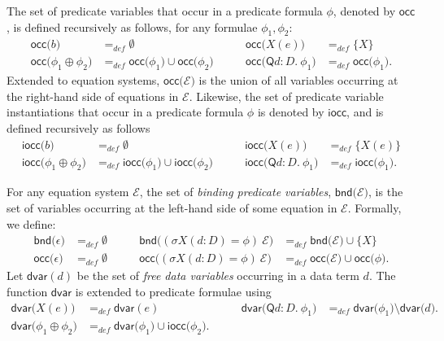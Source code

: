 \documentclass{article}
\begin{document}
The set of predicate variables that occur in a predicate formula $\phi $,
denoted by $\mathsf{occ}$, is defined recursively as follows, for any
formulae $\phi _{1},\phi _{2}$:
\begin{equation*}
\begin{array}{llll}
\mathsf{occ(}{b)} & =_{def}\emptyset & \mathsf{occ(}{X(e))} & =_{def}\{X\}
\\
\mathsf{occ(}{\phi _{1}\oplus \phi _{2})} & =_{def}\mathsf{occ(}{\phi _{1})}%
\cup \mathsf{occ(}{\phi _{2})}\qquad & \mathsf{occ}(\mathsf{Q}d:D{.~\phi
_{1})} & =_{def}\mathsf{occ(}{\phi _{1})}.%
\end{array}%
\end{equation*}%
Extended to equation systems, $\mathsf{occ}{(}\mathcal{E}{)}$ is the union
of all variables occurring at the right-hand side of equations in $\mathcal{E%
}$. Likewise, the set of predicate variable instantiations that occur in a
predicate formula $\phi $ is denoted by $\mathsf{iocc}$, and is defined
recursively as follows%
\begin{equation*}
\begin{array}{llll}
\mathsf{iocc(}{b)} & =_{def}\emptyset & \mathsf{iocc(}{X(e))} &
=_{def}\{X(e)\} \\
\mathsf{iocc(}{\phi _{1}\oplus \phi _{2})} & =_{def}\mathsf{iocc(}{\phi _{1})%
}\cup \mathsf{iocc(}{\phi _{2})}\qquad & \mathsf{iocc}(\mathsf{Q}d:D{.~\phi
_{1})} & =_{def}\mathsf{iocc(}{\phi _{1})}.%
\end{array}%
\end{equation*}

For any equation system $\mathcal{E}$, the set of \emph{binding predicate
variables}, $\mathsf{bnd(}\mathcal{E})$, is the set of variables occurring
at the left-hand side of some equation in $\mathcal{E}$. Formally, we
define:
\begin{equation*}
\begin{array}{llll}
\mathsf{bnd(}{\epsilon )} & =_{def}\emptyset \qquad & \mathsf{bnd(}{(\sigma
X(d{:}D)=\phi )~\mathcal{E)}} & =_{def}\mathsf{bnd(}{\mathcal{E)}}\cup \{X\}
\\
\mathsf{occ(}{\epsilon )} & =_{def}\emptyset \qquad & \mathsf{occ(}{(\sigma
X(d{:}D)=\phi )~\mathcal{E)}} & =_{def}\mathsf{occ(}{\mathcal{E)}}\cup
\mathsf{occ(}{\phi )}.%
\end{array}%
\end{equation*}%
Let $\mathsf{dvar}(d)$ be the set of \emph{free data variables} occurring in
a data term $d$. The function $\mathsf{dvar}$ is extended to predicate
formulae using%
\begin{equation*}
\begin{array}{llll}
\mathsf{dvar(}{X(e))} & =_{def}\mathsf{dvar}(e) & \mathsf{dvar}(\mathsf{Q}d:D%
{.~\phi _{1})} & =_{def}\mathsf{dvar(}{\phi _{1})}\setminus \mathsf{dvar(}d{)%
}. \\
\mathsf{dvar(}{\phi _{1}\oplus \phi _{2})} & =_{def}\mathsf{dvar(}{\phi _{1})%
}\cup \mathsf{iocc(}{\phi _{2}).}\qquad &  &
\end{array}%
\end{equation*}
\end{document}
